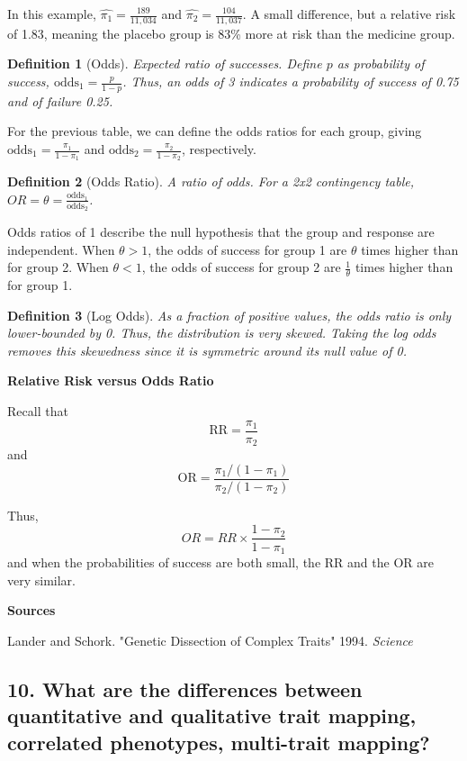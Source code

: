 \documentclass{tufte-handout}
\theoremstyle{noparens}
\newtheorem*{define}{Definition}
\begin{document}
In this example, $\hat{\pi_1} = \frac{189}{11,034}$ and $\hat{\pi_2} = \frac{104}{11,037}$. A small difference, but a relative risk of 1.83, meaning the placebo group is 83\% more at risk than the medicine group.

\begin{define}[Odds]
Expected ratio of successes. Define $p$ as probability of success, $\text{odds}_1 = \frac{p}{1-p}$. Thus, an odds of 3 indicates a probability of success of 0.75 and of failure 0.25.
\end{define}

For the previous table, we can define the odds ratios for each group, giving $\text{odds}_1 = \frac{\pi_1}{1-\pi_1}$ and $\text{odds}_2 = \frac{\pi_2}{1-\pi_2}$, respectively. 

\begin{define}[Odds Ratio]
A ratio of odds. For a 2x2 contingency table, $OR = \theta = \frac{\text{odds}_1}{\text{odds}_2}$.
\end{define}

Odds ratios of 1 describe the null hypothesis that the group and response are independent. When $\theta > 1$, the odds of success for group 1 are $\theta$ times higher than for group 2. When $\theta < 1$, the odds of success for group 2 are $\frac{1}{\theta}$ times higher than for group 1.

\begin{define}[Log Odds]
As a fraction of positive values, the odds ratio is only lower-bounded by 0. Thus, the distribution is very skewed. Taking the log odds removes this skewedness since it is symmetric around its null value of 0.
\end{define}

\textbf{Relative Risk versus Odds Ratio}

Recall that \[ \text{RR} = \frac{\pi_1}{\pi_2} \] and \[ \text{OR} = \frac{\pi_1 / (1-\pi_1)}{\pi_2 / (1-\pi_2)} \]

Thus, \[ OR = RR \times \frac{1-\pi_2}{1-\pi_1} \] and when the probabilities of success are both small, the RR and the OR are very similar.
 
 \textbf{Sources}
 
 Lander and Schork. "Genetic Dissection of Complex Traits" 1994. \emph{Science}
 
\newpage
\subsection{10.
What are the differences between quantitative and qualitative trait mapping, correlated phenotypes, multi-trait mapping?}
\end{document}
